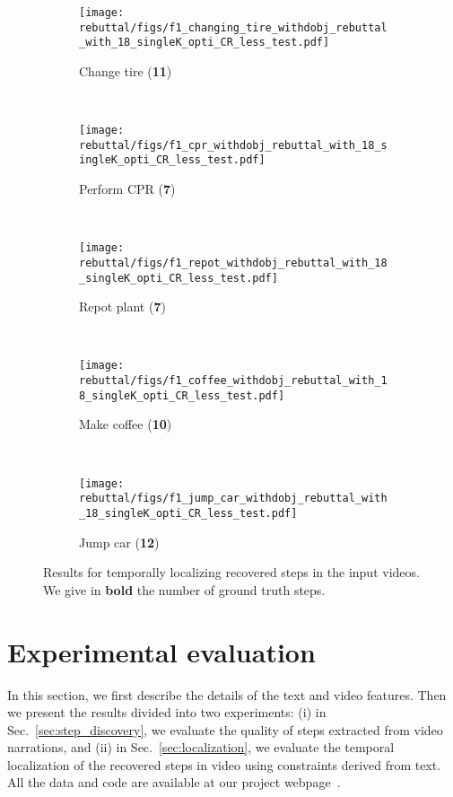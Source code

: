 \documentclass[10pt,twocolumn,letterpaper]{article}
\begin{document}
%

%
%
%

%
%
%
%
%
%
%
%
%
%
%
%
%
%
%
%
%
%
%
%
%
%
%
%
%
%
%
%
%
%
%
%
%
%
%
%
%
%
%
%
%
%
%
%
%
%
%
%
\begin{figure*}[t!]
    \centering
    \begin{subfigure}[t]{0.19\linewidth}
        \centering
        \texttt{[image: rebuttal/figs/f1\_changing\_tire\_withdobj\_rebuttal\_with\_18\_singleK\_opti\_CR\_less\_test.pdf]}
        \caption{Change tire (\textbf{11})}
    \end{subfigure}%
    ~ 
    \begin{subfigure}[t]{0.19\linewidth}
        \centering
        \texttt{[image: rebuttal/figs/f1\_cpr\_withdobj\_rebuttal\_with\_18\_singleK\_opti\_CR\_less\_test.pdf]}
        \caption{Perform CPR (\textbf{7})}
    \end{subfigure}%
	~
	\begin{subfigure}[t]{0.19\linewidth}
        \centering
        \texttt{[image: rebuttal/figs/f1\_repot\_withdobj\_rebuttal\_with\_18\_singleK\_opti\_CR\_less\_test.pdf]}
        \caption{Repot plant (\textbf{7})}
    \end{subfigure}%
    ~
    \begin{subfigure}[t]{0.19\linewidth}
        \centering
        \texttt{[image: rebuttal/figs/f1\_coffee\_withdobj\_rebuttal\_with\_18\_singleK\_opti\_CR\_less\_test.pdf]}
        \caption{Make coffee (\textbf{10})}
    \end{subfigure}%
    ~
    \begin{subfigure}[t]{0.19\linewidth}
        \centering
        \texttt{[image: rebuttal/figs/f1\_jump\_car\_withdobj\_rebuttal\_with\_18\_singleK\_opti\_CR\_less\_test.pdf]}
        \caption{ Jump car (\textbf{12})}
    \end{subfigure}%
    \vspace{-1mm}
    \caption{\small Results for temporally localizing recovered steps in the input videos.
    We give in \textbf{bold} the number of ground truth steps.   
%
    }
    \vspace{-3mm}
    \label{tab:exp-localization}
\end{figure*}


\section{Experimental evaluation}
\setlength{\tabcolsep}{6pt}
\label{sec:experiments}
%
In this section, we first describe the details of the text and video features. 
Then we present the results divided into two experiments:
(i) in Sec.~\ref{sec:step_discovery}, we evaluate the quality of steps extracted from video narrations, and
(ii) in Sec.~\ref{sec:localization}, we evaluate the temporal localization of the recovered steps in video using constraints derived from text. 
All the data and code are available at our project webpage~\cite{Alayrac15UnsupervisedWeb}.
\end{document}
